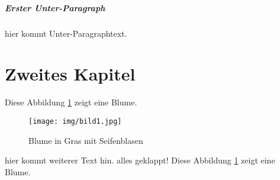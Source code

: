 \documentclass[11pt]{article}
\begin{document}
\subparagraph{Erster Unter-Paragraph}
hier kommt Unter-Paragraphtext.

\newpage
\section{Zweites Kapitel}

Diese Abbildung \ref{fig: Blume} zeigt eine Blume.

\begin{figure}[H]
    \centering
    \texttt{[image: img/bild1.jpg]}
    \caption[Blume]{Blume in Gras mit Seifenblasen}
    \label{fig: Blume}
\end{figure}
hier kommt weiterer Text hin.
alles geklappt!
Diese Abbildung \ref{fig: Blume} zeigt eine Blume.
\end{document}
